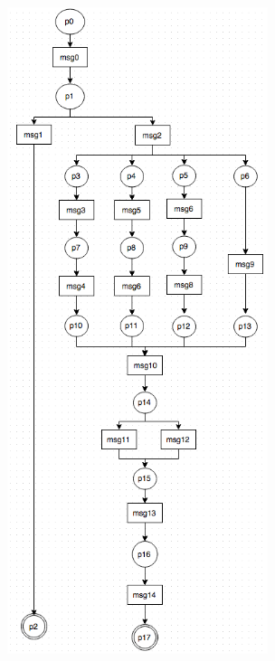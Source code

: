 \documentclass[conference]{IEEEtran}
\begin{document}
 \begin{figure} 
 \centerline{
 \includegraphics[width=3in]{figures/readDcache.png}}
 

\end{figure}
\end{document}
